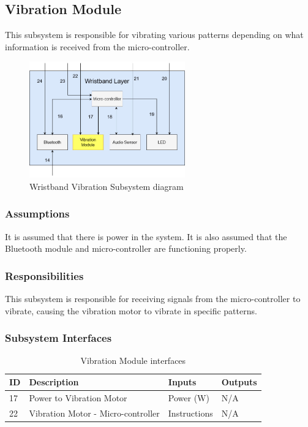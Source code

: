 \subsection{Vibration Module}
This subsystem is responsible for vibrating various patterns depending on what information is received from the micro-controller.

\begin{figure}[h!]
	\centering
 	\includegraphics[width=0.60\textwidth]{images/wristband-vibration.jpg}
 \caption{Wristband Vibration Subsystem diagram}
\end{figure}

\subsubsection{Assumptions}
It is assumed that there is power in the system. It is also assumed that the Bluetooth module and micro-controller are functioning properly.

\subsubsection{Responsibilities}
This subsystem is responsible for receiving signals from the micro-controller to vibrate, causing the vibration motor to vibrate in specific patterns.

\subsubsection{Subsystem Interfaces}

\begin {table}[H]
\caption {Vibration Module interfaces} 
\begin{center}
    \begin{tabular}{ | p{1cm} | p{6cm} | p{3cm} | p{3cm} |}
    \hline
    ID & Description & Inputs & Outputs \\ \hline
    17 & Power to Vibration Motor & Power (W) &  N/A \\ \hline
    22 & Vibration Motor - Micro-controller & Instructions & N/A \\ \hline
    \end{tabular}
\end{center}
\end{table}
